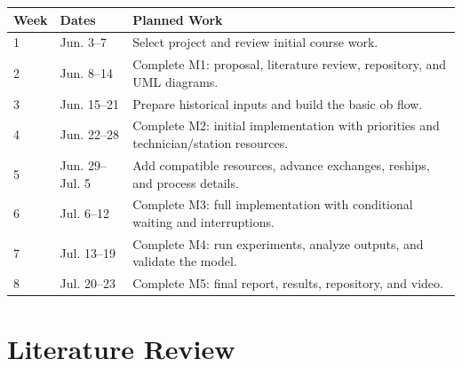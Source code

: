 \documentclass[12pt, letterpaper, twoside]{article}
\begin{document}
\begin{center}
\small
\begin{tabular}{p{0.4in} p{1.25in} p{3.75in}}
\toprule
\textbf{Week} & \textbf{Dates} & \textbf{Planned Work} \\
\midrule
1 & Jun. 3--7 & Select project and review initial course work. \\
2 & Jun. 8--14 & Complete M1: proposal, literature review, repository, and UML
diagrams. \\
3 & Jun. 15--21 & Prepare historical inputs and build the basic ob flow. \\
4 & Jun. 22--28 & Complete M2: initial implementation with priorities and
technician/station resources. \\
5 & Jun. 29--Jul. 5 & Add compatible resources, advance exchanges, reships,
and process details. \\
6 & Jul. 6--12 & Complete M3: full implementation with conditional waiting and
interruptions. \\
7 & Jul. 13--19 & Complete M4: run experiments, analyze outputs, and validate
the model. \\
8 & Jul. 20--23 & Complete M5: final report, results, repository, and video. \\
\bottomrule
\end{tabular}
\end{center}

\section{Literature Review}
\label{sec:literature}
\end{document}
